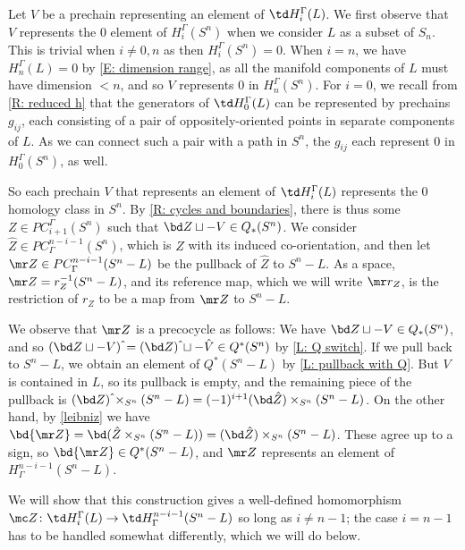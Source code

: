 \begin{example}
Let $V$ be a prechain representing an element of $\td H_i^\Gamma(L)$.
We first observe that $V$ represents the $0$ element of $H_i^\Gamma(S^n)$ when we consider $L$ as a subset of $S_n$.
This is trivial when $i \neq 0,n$ as then $H_i^\Gamma(S^n)=0$.
When $i = n$, we have $H_n^\Gamma(L) = 0$ by \cref{E: dimension range}, as all the manifold components of $L$ must have dimension $<n$, and so $V$ represents $0$ in $H_n^\Gamma(S^n)$.
For $i=0$, we recall from \cref{R: reduced h} that the generators of $\td H_0^\Gamma(L)$ can be represented by prechains $g_{ij}$, each consisting of a pair of oppositely-oriented points in separate components of $L$.
As we can connect such a pair with a path in $S^n$, the $g_{ij}$ each represent $0$ in $H_0^\Gamma(S^n)$, as well.

So each prechain $V$ that represents an element of $\td H_i^\Gamma(L)$ represents the $0$ homology class in $S^n$. By \cref{R: cycles and boundaries}, there is thus some $Z \in PC^\Gamma_{i+1}(S^n)$ such that $\bd Z \sqcup -V \in Q_*(S^n)$.
We consider $\hat Z \in PC_\Gamma^{n-i-1}(S^n)$, which is $Z$ with its induced co-orientation, and then let $\mr Z \in PC_\Gamma^{n-i-1}(S^n - L)$ be the pullback of $\hat Z$ to $S^n-L$.
As a space, $\mr Z = r_Z^{-1}(S^n-L)$, and its reference map, which we will write $\mr r_Z$, is the restriction of $r_Z$ to be a map from $\mr Z$ to $S^n-L$.

We observe that $\mr Z$ is a precocycle as follows:
We have $\bd Z \sqcup -V \in Q_*(S^n)$, and so $(\bd Z \sqcup -V)\,\hat{\vrule height1.3ex width0pt} = (\bd Z)\,\hat{\vrule height1.3ex width0pt} \sqcup - \hat V \in Q^*(S^n)$ by \cref{L: Q switch}.
If we pull back to $S^n - L$, we obtain an element of $Q^*(S^n - L)$ by \cref{L: pullback with Q}.
But $V$ is contained in $L$, so its pullback is empty, and the remaining piece of the pullback is
$(\bd Z)\,\hat{\vrule height1.3ex width0pt} \times_{S^n} (S^n - L) = (-1)^{i+1} (\bd \hat Z) \times_{S^n} (S^n - L)$.
On the other hand, by \cref{leibniz} we have $\bd{\mr Z} = \bd (\hat Z \times_{S^n} (S^n - L)) = (\bd \hat Z) \times_{S^n} (S^n - L)$.
These agree up to a sign, so $\bd{\mr Z} \in Q^*(S^n - L)$, and $\mr Z$ represents an element of $H^{n-i-1}_\Gamma(S^n - L)$.

We will show that this construction gives a well-defined homomorphism $\mc Z \colon \td H_i^\Gamma(L) \to \td H^{n-i-1}_\Gamma(S^n-L)$ so long as $i \neq n-1$; the case $i = n-1$ has to be handled somewhat differently, which we will do below.




\end{example}
